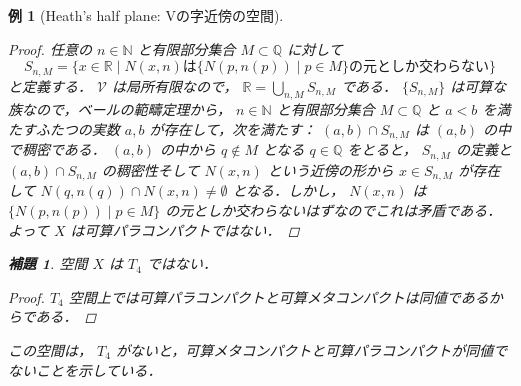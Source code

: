 \documentclass[leqno, 12pt]{ltjsarticle}
\newtheorem{lem}[thm]{補題}
\newtheorem{exam}[thm]{例}
\newcommand{\nn}{\mathbb{N}}
\renewcommand{\qq}{\mathbb{Q}}
\newcommand{\rr}{\mathbb{R}}
\begin{document}
\begin{exam}[Heath's half plane: Vの字近傍の空間]
\begin{proof}
任意の
$n\in \nn$
と有限部分集合
$M\subset \qq$
に対して
\[
S_{n, M}=\{x\in \rr \mid \text{$N(x,n)$は$\{N(p, n(p)) \mid p\in M\}$の元としか交わらない}\}
\]
と定義する．
$\mathcal{V}$
は局所有限なので，
$\rr=\bigcup_{n,M}S_{n,M}$
である．
$\{S_{n,M}\}$
は可算な族なので，ベールの範疇定理から，
$n\in \nn$
と有限部分集合
$M\subset \qq$
と
$a<b$
を満たすふたつの実数
$a,b$
が存在して，次を満たす：
$(a,b)\cap S_{n,M}$
は
$(a,b)$
の中で稠密である．
$(a,b)$
の中から
$q\notin M$
となる
$q\in \qq$
をとると，
$S_{n,M}$
の定義と
$(a,b)\cap S_{n,M}$
の稠密性そして
$N(x,n)$
という近傍の形から
$x\in S_{n,M}$
が存在して
$N(q,n(q))\cap N(x,n)\neq\emptyset$
となる．しかし，
$N(x,n)$
は
$\{N(p, n(p)) \mid p\in M\}$
の元としか交わらないはずなのでこれは矛盾である．よって
$X$
は可算パラコンパクトではない．
\end{proof}

\begin{lem}
空間
$X$
は
$T_{4}$
ではない．
\end{lem}
\begin{proof}
$T_{4}$
空間上では可算パラコンパクトと可算メタコンパクトは同値であるからである．
\end{proof}

この空間は，
$T_{4}$
がないと，可算メタコンパクトと可算パラコンパクトが同値でないことを示している．
\end{exam}
\end{document}
